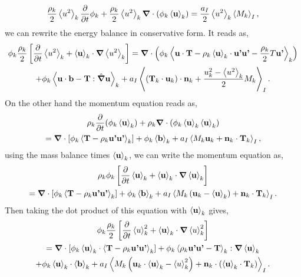 \begin{equation*}
    \frac{\rho_k}{2} \left<u^2\right>_k \frac{\partial}{\partial t} \phi_k 
    + \frac{\rho_k}{2} \left<u^2\right>_k \bm{\nabla} \cdot\left(\phi_k\left<\textbf{u}\right>_k\right)
    = \frac{a_I}{2}\left<u^2\right>_k\left<M_k\right>_I,
\end{equation*}
we can rewrite the energy balance in conservative form. 
It reads as, 
\begin{multline}
    \phi_k\frac{\rho_k}{2}  \left[
        \frac{\partial }{\partial t}
        \left<u^2\right>_k
        +\left<\textbf{u}\right>_k\cdot\bm{\nabla} 
        \left<u^2\right>_k
    \right]
    =
    \bm{\nabla}\cdot\left(
        \phi_k
        \left<\textbf{u}\cdot \textbf{T}
        - \rho_k\left<\textbf{u}\right>_k\cdot\textbf{u'u'}
        - \frac{\rho_k}{2}T\textbf{u'}\right>_k
    \right)\\
    +\phi_k\left<\textbf{u}\cdot\textbf{b} - \textbf{T}: \hat{\bm{\nabla}}\textbf{u}\right>_k
    +a_I \left<
        (\textbf{T}_k\cdot\textbf{u}_k)\cdot\textbf{n}_k
        + \frac{u^2_k - \left<u^2\right>_k}{2} M_k\right>_I.
    \label{ap:eq:avg_k_u_2}
\end{multline}
On the other hand the momentum equation reads as, 
\begin{multline*}
    \rho_k\frac{\partial}{\partial t} (\phi_k\left<\textbf{u}\right>_k) 
    + \rho_k\bm{\nabla}\cdot(\phi_k\left<\textbf{u}\right>_k\left<\textbf{u}\right>_k)\\
    = \bm{\nabla}\cdot\left[
        \phi_k \left<\textbf{T}
        - \rho_k \textbf{u'u'}\right>_k
    \right]
    +\phi_k\left<\textbf{b}\right>_k
    + a_I\left<M_k \textbf{u}_k +\textbf{n}_k\cdot\textbf{T}_k\right>_I,
\end{multline*}
using the mass balance times $\left<\textbf{u}\right>_k$, we can write the momentum equation as, 
\begin{multline*}
    \rho_k \phi_k \left[
        \frac{\partial}{\partial t} \left<\textbf{u}\right>_k
        + \left<\textbf{u}\right>_k\cdot\bm{\nabla}\left<\textbf{u}\right>_k
    \right]\\
    = \bm{\nabla}\cdot\left[
        \phi_k \left<\textbf{T}
        - \rho_k \textbf{u'u'}\right>_k
    \right]
    +\phi_k\left<\textbf{b}\right>_k
    + a_I\left<M_k \left(\textbf{u}_k - \left<\textbf{u}\right>_k\right) +\textbf{n}_k\cdot\textbf{T}_k\right>_I.
\end{multline*}
Then taking the dot product of this equation with $\left<\textbf{u}\right>_k$ gives, 
\begin{multline}
    \phi_k\frac{\rho_k}{2}  \left[
        \frac{\partial}{\partial t} \left<u\right>_k^2
        + \left<\textbf{u}\right>_k\cdot\bm{\nabla}\left<u\right>_k^2
    \right]\\
    = \bm{\nabla}\cdot\left[
        \phi_k \left<\textbf{u}\right>_k\cdot\left<\textbf{T}
        - \rho_k  \textbf{u'u'}\right>_k
    \right]
    +\phi_k\left<\rho_k \textbf{u'u'} - \textbf{T}\right>_k:\bm{\nabla}
         \left<\textbf{u}\right>_k\\
    +\phi_k\left<\textbf{u}\right>_k\cdot\left<\textbf{b}\right>_k
    + a_I\left<M_k \left(\textbf{u}_k\cdot\left<\textbf{u}\right>_k 
    - \left<u\right>_k^2\right) +\textbf{n}_k\cdot(\left<\textbf{u}\right>_k\cdot\textbf{T}_k)\right>_I.
    \label{ap:eq:avg_k_u_u}
\end{multline}
